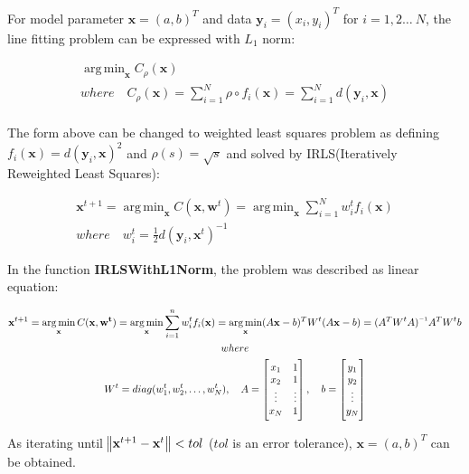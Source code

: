 \documentclass[paper=a4, fontsize=11pt]{scrartcl} %
\numberwithin{equation}{section} %
\numberwithin{figure}{section} %
\numberwithin{table}{section} %
\newcommand{\funcname}[1]{\textbf{#1}}
\newcommand{\inv}{^{\raisebox{.2ex}{$\scriptscriptstyle-1$}}}
\renewcommand{\vec}[1]{\mathbf{#1}}
\DeclareMathOperator*{\argmin}{arg\,min} %
\begin{document}
For model parameter $\vec{x} = (a, b)^{T}$ and data $\vec{y}_{i} = (x_{i}, y_{i})^{T}$ for $i = 1, 2 \dots\ N$, the line fitting problem can be expressed with $L_{1}$ norm:

\begin{gather*}
\argmin_{\vec{x}} C_{\rho}(\vec{x}) \\ 
where \quad C_{\rho}(\vec{x}) = \sum_{i=1}^{N} \rho \circ f_{i}(\vec{x}) = \sum_{i=1}^{N} d(\vec{y}_{i}, \vec{x}) \\
\end{gather*}

The form above can be changed to weighted least squares problem as defining $f_{i}(\vec{x}) = d(\vec{y}_{i}, \vec{x})^{2}$ and $\rho(s) = \sqrt{s}$ and solved by IRLS(Iteratively Reweighted Least Squares):

\begin{gather*} 
\vec{x}^{t+1} = \argmin_{\vec{x}} C(\vec{x}, \vec{w}^{t}) = \argmin_{\vec{x}} \sum_{i=1}^{N}w_{i}^{t}f_{i}(\vec{x}) \\ 
where \quad w_{i}^{t} = \frac{1}{2}d(\vec{y}_{i}, \vec{x}^{t})^{-1}
\end{gather*}

In the function \funcname{IRLSWithL1Norm}, the problem was described as linear equation:

\begin{gather*} 
\vec{x}^{t+1} = \argmin_{\vec{x}} C(\vec{x}, \vec{w^{t}}) = \argmin_{\vec{x}} \sum_{i=1}^{n}w_{i}^{t}f_{i}(\vec{x}) 
	= \argmin_{\vec{x}}(A\vec{x} - b)^{T} W^{t} (A\vec{x} - b) = (A^{T}W^{t}A)\inv A^{T}W^{t}b\\
where \\
W^{t} = diag({w_{1}^{t}, w_{2}^{t}, \dots, w_{N}^{t}}), 
\quad 
A = 
\begin{bmatrix}
    x_{1}	&	1 \\
    x_{2}	&	1 \\
    \vdots	& \vdots	\\
    x_{N}	&	1
\end{bmatrix},
\quad b = 
\begin{bmatrix}
    y_{1}	\\
    y_{2}	\\
    \vdots	\\
    y_{N}
\end{bmatrix}
\end{gather*}

As iterating until $\norm{\vec{x}^{t+1} - \vec{x}^{t}} < tol$ ($tol$ is an error tolerance), $\vec{x} = (a, b)^{T}$ can be obtained.
\end{document}
